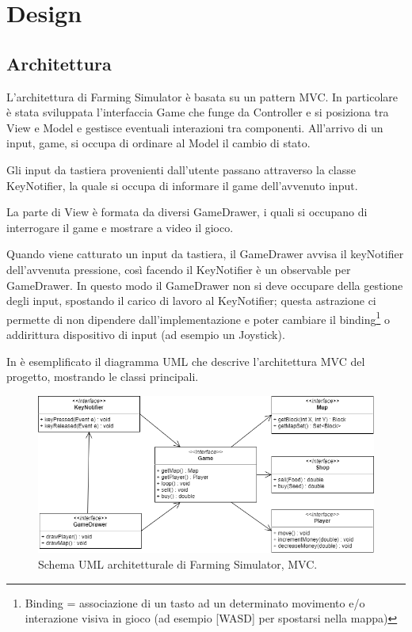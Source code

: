 \documentclass[a4paper,12pt]{report}
\begin{document}
\chapter{Design}

\section{Architettura}

L’architettura di Farming Simulator è basata su un pattern MVC. In particolare è stata sviluppata l’interfaccia Game che funge da Controller e si posiziona tra View e Model e gestisce eventuali interazioni tra componenti. All’arrivo di un input, game, si occupa di ordinare al Model il cambio di stato.

\hfill\break
Gli input da tastiera provenienti dall’utente passano attraverso la classe KeyNotifier, la quale si occupa di informare il game dell’avvenuto input. 

\hfill\break
La parte di View è formata da diversi GameDrawer, i quali si occupano di interrogare il game e mostrare a video il gioco.

Quando viene catturato un input da tastiera, il GameDrawer avvisa il keyNotifier dell’avvenuta pressione, così facendo il KeyNotifier è un observable per GameDrawer. In questo modo il GameDrawer non si deve occupare della gestione degli input, spostando il carico di lavoro al KeyNotifier; questa astrazione ci permette di non dipendere dall'implementazione e poter cambiare il binding\footnote[1]{Binding = associazione di un tasto ad un determinato movimento e/o interazione visiva in gioco (ad esempio [WASD] per spostarsi nella mappa)} o addirittura dispositivo di input (ad esempio un Joystick). 

\hfill\break
In  è esemplificato il diagramma UML che descrive l'architettura MVC del progetto, mostrando le classi principali.

\hfill\break
\begin{figure}[!htb]
\centerline{\includegraphics[scale=.65]{img/UML_2-1.png}}

\caption{Schema UML architetturale di Farming Simulator, MVC.}
\label{img:MVC}
\end{figure}
\end{document}
